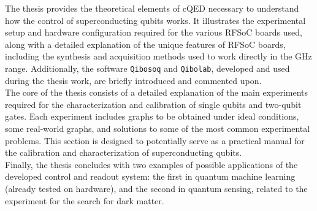 \documentclass{article}
\newcommand{\Qibolab}{\texttt{Qibolab}\xspace}
\newcommand{\Qibosoq}{\texttt{Qibosoq}\xspace}
\begin{document}
%
The thesis provides the theoretical elements of cQED necessary to understand how the control of superconducting qubits works.
It illustrates the experimental setup and hardware configuration required for the various RFSoC boards used, along with a detailed explanation of the unique features of RFSoC boards, including the synthesis and acquisition methods used to work directly in the GHz range. 
Additionally, the software \Qibosoq and \Qibolab, developed and used during the thesis work, are briefly introduced and commented upon.\\
%
The core of the thesis consists of a detailed explanation of the main experiments required for the characterization and calibration of single qubits and two-qubit gates.
Each experiment includes graphs to be obtained under ideal conditions, some real-world graphs, and solutions to some of the most common experimental problems.
This section is designed to potentially serve as a practical manual for the calibration and characterization of superconducting qubits.\\
%
Finally, the thesis concludes with two examples of possible applications of the developed control and readout system: the first in quantum machine learning (already tested on hardware), and the second in quantum sensing, related to the experiment for the search for dark matter.
\end{document}
